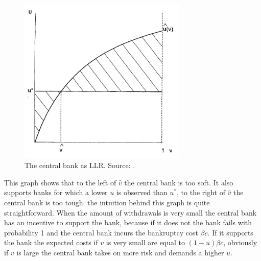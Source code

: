 \documentclass[twoside, 12pt]{article}
\numberwithin{equation}{section}
\begin{document}
\begin{figure}[htbp]
\begin{centering}
\includegraphics[width=8cm]{RepulloCB2000}
\caption{The central bank as LLR. Source: \protect{}.}
\label{fig:RepCB}
\end{centering}
\end{figure}

This graph shows that to the left of $\hat{v}$ the central bank is too soft. It also supports banks for which a lower $u$ is observed than $u^*$, to the right of $\hat{v}$ the central bank is too tough. the intuition behind this graph is quite straightforward. When the amount of withdrawals is very small the central bank has an incentive to support the bank, because if it does not the bank fails with probability 1 and the central bank incurs the bankruptcy cost $\beta c$. If it supports the bank the expected costs if $v$ is very small are equal to $(1-u)\beta c$, obviously if $v$ is large the central bank takes on more risk and demands a higher $u$.
\end{document}
